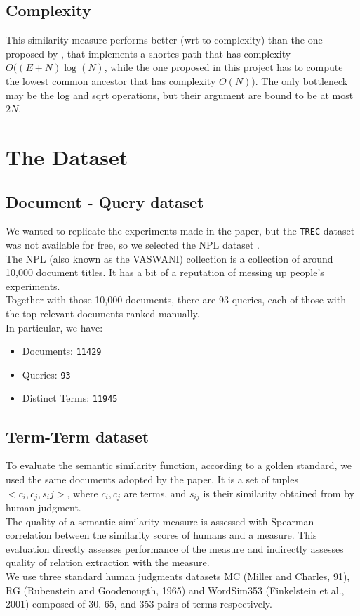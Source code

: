 \documentclass[letterpaper, 10 pt, conference]{ieeeconf}  %
\begin{document}
\subsection{Complexity}
This similarity measure performs better (wrt to complexity) than the one proposed by \cite{c1}, that implements a shortes path that has complexity $O((E+N)\log(N)$, while the one proposed in this project has to compute the lowest common ancestor that has complexity $O(N))$. The only bottleneck may be the log and sqrt operations, but their argument are bound to be at most $2N$.
\section{The Dataset}
\subsection{Document - Query dataset}
We wanted to replicate the experiments made in the paper, but the \texttt{TREC} dataset was not available for free, so we selected the NPL dataset \cite{c2}.\\
The NPL (also known as the VASWANI) collection is a collection of around 10,000 document titles. It has a bit of a reputation of messing up people's experiments.\\
Together with those 10,000 documents, there are 93 queries, each of those with the top relevant documents ranked manually.\\
In particular, we have:
\begin{itemize}
    \item Documents: \texttt{11429}
    \item Queries: \texttt{93}
    \item Distinct Terms: \texttt{11945}
\end{itemize}
\subsection{Term-Term dataset}
To evaluate the semantic similarity function, according to a golden standard, we used the same documents adopted by the paper. It is a set of tuples $<c_i, c_j, s_ij>$, where $c_i, c_j$ are terms, and $s_{ij}$ is their similarity obtained from by human judgment.\\
The quality of a semantic similarity measure is assessed with Spearman correlation between the similarity scores of humans and a measure. This evaluation directly assesses performance of the measure and indirectly assesses quality of relation extraction with the measure.\\
We use three standard human judgments datasets MC (Miller and Charles, 91), RG (Rubenstein and Goodenougth, 1965) and WordSim353 (Finkelstein et al., 2001) composed of 30, 65, and 353 pairs of terms respectively.
\end{document}
